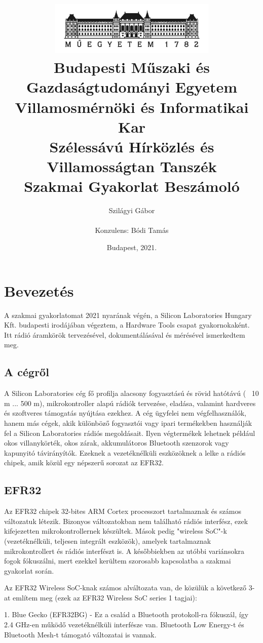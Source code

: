 \documentclass[a4paper,12pt,titlepage]{article}
\title{
\includegraphics[width=0.6\textwidth]{bme.pdf} \\
\centering
\large{\textbf{Budapesti Műszaki és Gazdaságtudományi Egyetem}\\
\textbf{Villamosmérnöki és Informatikai Kar}\\
\textbf{Szélessávú Hírközlés és Villamosságtan Tanszék}}\\
\vspace{6cm}
\huge{\textbf{Szakmai Gyakorlat Beszámoló}} \\
\vspace{2cm}}
\author{Szilágyi Gábor \\\vspace{2cm}\\ Konzulens: Bódi Tamás}
\date{Budapest, 2021.}
\begin{document}
  	\maketitle
  	

	\tableofcontents


	\newpage
  

\section{Bevezetés}

	A szakmai gyakorlatomat 2021 nyarának végén, a Silicon Laboratories Hungary Kft. budapesti irodájában végeztem, a Hardware Tools csapat gyakornokaként. Itt rádió áramkörök tervezésével, dokumentálásával és mérésével ismerkedtem meg.

\subsection{A cégről}

	A Silicon Laboratories cég fő profilja alacsony fogyasztású és rövid hatótávú (~ 10 m ... 500 m), mikrokontroller alapú rádiók tervezése, eladása, valamint hardveres és szoftveres támogatás nyújtása ezekhez. A cég ügyfelei nem végfelhasználók, hanem más cégek, akik különböző fogyasztói vagy ipari termékekben használják fel a Silicon Laboratories rádiós megoldásait. Ilyen végtermékek lehetnek például okos villanykörték, okos zárak, akkumulátoros Bluetooth szenzorok vagy kapunyitó távirányítók. Ezeknek a vezetéknélküli eszközöknek a lelke a rádiós chipek, amik közül egy népszerű sorozat az EFR32.

\subsection{EFR32}

	Az EFR32 chipek 32-bites ARM Cortex processzort tartalmaznak és számos változatuk létezik. Bizonyos változatokban nem található rádiós interfész, ezek kifejezetten mikrokontrollernek készültek. Mások pedig "wireless SoC"-k (vezetéknélküli, teljesen integrált eszközök), amelyek tartalmaznak mikrokontrollert és rádiós interfészt is. A későbbiekben az utóbbi variánsokra fogok fókuszálni, mert ezekkel kerültem szorosabb kapcsolatba a szakmai gyakorlat során.

	Az EFR32 Wireless SoC-knak számos alváltozata van, de közülük a következő 3-at említem meg (ezek az EFR32 Wireless SoC series 1 tagjai):

	1. Blue Gecko (EFR32BG) - Ez a család a Bluetooth protokoll-ra fókuszál, így 2.4 GHz-en működő vezetéknélküli interfésze van. Bluetooth Low Energy-t és Bluetooth Mesh-t támogató változatai is vannak.
\end{document}
